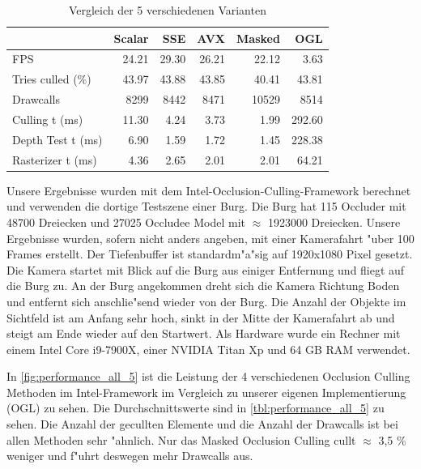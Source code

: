 \documentclass[journal]{vgtc}
\begin{document}
\begin{table}
	\begin{tabular}{| l | r | r | r | r | r |}
		\hline
		                   & Scalar  & SSE     & AVX      & Masked    & OGL      \\ \hline
		FPS                & 24.21   & 29.30   & 26.21    & 22.12     & 3.63     \\ \hline
		Tries culled (\%)  & 43.97   & 43.88   & 43.85    & 40.41     & 43.81    \\ \hline
		Drawcalls          & 8299    & 8442    & 8471     & 10529     & 8514     \\ \hline
		Culling t (ms)     & 11.30   & 4.24    & 3.73     & 1.99      & 292.60   \\ \hline
		Depth Test t (ms)  & 6.90    & 1.59    & 1.72     & 1.45      & 228.38   \\ \hline
		Rasterizer t (ms)  & 4.36    & 2.65    & 2.01     & 2.01      & 64.21    \\ 
		\hline
	\end{tabular}
	\caption{Vergleich der 5 verschiedenen Varianten}
	\label{tbl:performance_all_5}
\end{table}

Unsere Ergebnisse wurden mit dem Intel-Occlusion-Culling-Framework berechnet und verwenden die dortige Testszene einer Burg.
Die Burg hat 115 Occluder mit 48700 Dreiecken und 27025  Occludee Model mit $\approx$ 1923000 Dreiecken.
Unsere Ergebnisse wurden, sofern nicht anders angeben, mit einer Kamerafahrt "uber 100 Frames erstellt.
Der Tiefenbuffer ist standardm"a"sig auf 1920x1080 Pixel gesetzt.
Die Kamera startet mit Blick auf die Burg aus einiger Entfernung und fliegt auf die Burg zu.
An der Burg angekommen dreht sich die Kamera Richtung Boden und entfernt sich anschlie"send wieder von der Burg.
Die Anzahl der Objekte im Sichtfeld ist am Anfang sehr hoch, sinkt in der Mitte der Kamerafahrt ab und steigt am Ende wieder auf den Startwert.
Als Hardware wurde ein Rechner mit einem Intel Core i9-7900X, einer NVIDIA Titan Xp und 64 GB RAM verwendet.

In \autoref{fig:performance_all_5} ist die Leistung der 4 verschiedenen Occlusion Culling Methoden im Intel-Framework im Vergleich zu unserer eigenen Implementierung (OGL) zu sehen.
Die Durchschnittswerte sind in \autoref{tbl:performance_all_5} zu sehen.
Die Anzahl der gecullten Elemente und die Anzahl der Drawcalls ist bei allen Methoden sehr "ahnlich.
Nur das Masked Occlusion Culling cullt $\approx$ 3,5 \% weniger und f"uhrt deswegen mehr Drawcalls aus.
\end{document}
